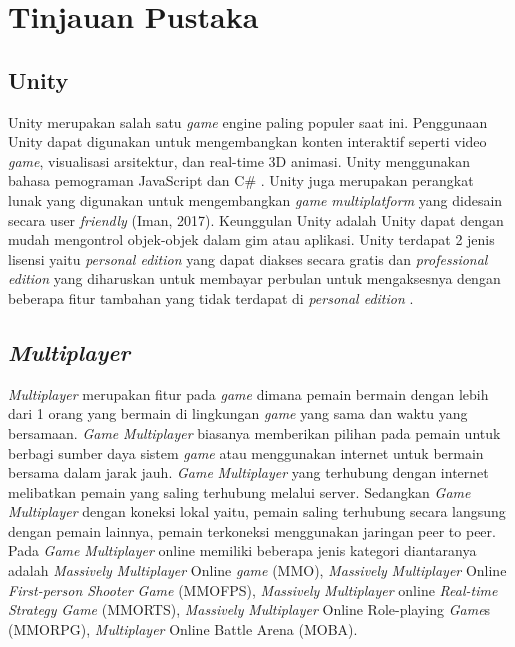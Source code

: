 \doublespacing
\section{Tinjauan Pustaka}
\subsection{Unity}
\noindent

Unity merupakan salah satu \textit{game} engine paling populer saat ini. Penggunaan Unity dapat digunakan untuk mengembangkan konten interaktif seperti video \textit{game}, 
visualisasi arsitektur, dan real-time 3D animasi. Unity menggunakan bahasa pemograman JavaScript dan 
C\# \cite{Ansori}. Unity juga merupakan perangkat lunak yang digunakan untuk mengembangkan \textit{game} \textit{multiplatform} yang didesain secara user \textit{friendly} 
(Iman, 2017). Keunggulan Unity adalah Unity 
dapat dengan mudah mengontrol objek-objek 
dalam gim atau aplikasi. Unity terdapat 2 jenis 
lisensi yaitu \textit{personal edition} yang dapat diakses 
secara gratis dan \textit{professional edition} yang 
diharuskan untuk membayar perbulan untuk 
mengaksesnya dengan beberapa fitur tambahan 
yang tidak terdapat di \textit{personal edition} \cite{Sarwodi}. 

\subsection{\textit{Multiplayer}}
\noindent

\textit{Multiplayer} merupakan fitur pada \textit{game} dimana pemain bermain dengan lebih dari 1 orang yang bermain 
di lingkungan \textit{game} yang sama dan waktu yang bersamaan. \textit{Game} \textit{Multiplayer} biasanya memberikan pilihan pada 
pemain untuk berbagi sumber daya sistem \textit{game} atau menggunakan internet untuk bermain bersama dalam jarak 
jauh. \textit{Game} \textit{Multiplayer} yang terhubung dengan internet melibatkan pemain yang saling terhubung melalui server. 
Sedangkan \textit{Game} \textit{Multiplayer} dengan koneksi lokal yaitu, pemain saling terhubung secara langsung dengan 
pemain lainnya, pemain terkoneksi menggunakan jaringan peer to peer. Pada \textit{Game} \textit{Multiplayer} online memiliki 
beberapa jenis kategori diantaranya adalah \textit{Massively} \textit{Multiplayer} Online \textit{game} (MMO), \textit{Massively} \textit{Multiplayer} 
Online \textit{First-person Shooter} \textit{Game} (MMOFPS), \textit{Massively} \textit{Multiplayer} online \textit{Real-time Strategy} \textit{Game}
(MMORTS), \textit{Massively} \textit{Multiplayer} Online Role-playing \textit{Game}s (MMORPG), \textit{Multiplayer} Online Battle Arena
(MOBA)\cite{Ansori}. 

